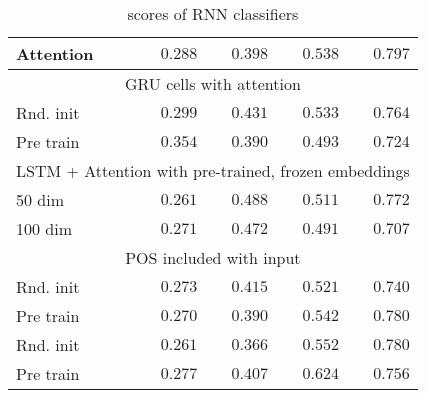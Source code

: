 \begin{table}
\begin{tabular}{lrrrr}
    Attention &         $0.288$  &         $0.398$  &         $0.538$  &         $0.797$  \\
    \midrule
              \multicolumn{5}{c}{GRU cells with attention} \\
    \midrule
    Rnd. init &         $0.299$  &         $0.431$  &         $0.533$  &         $0.764$  \\
    Pre train & $\mathbf{0.354}$ &         $0.390$  &         $0.493$  &         $0.724$  \\
    \midrule
              \multicolumn{5}{c}{LSTM + Attention with pre-trained, frozen embeddings} \\
    \midrule
    50 dim    &         $0.261$  & $\mathbf{0.488}$ &         $0.511$  &         $0.772$  \\
    100 dim   &         $0.271$  &         $0.472$  &         $0.491$  &         $0.707$  \\
    \midrule
              \multicolumn{5}{c}{POS included with input} \\
    \midrule
    Rnd. init &         $0.273$  &         $0.415$  &         $0.521$  &         $0.740$  \\
    Pre train &         $0.270$  &         $0.390$  &         $0.542$  &         $0.780$  \\
    Rnd. init &         $0.261$  &         $0.366$  &         $0.552$  &         $0.780$  \\
    Pre train &         $0.277$  &         $0.407$  & $\mathbf{0.624}$ &         $0.756$  \\
    \bottomrule
  \end{tabular}
  \caption{\FI scores of RNN classifiers}
  \label{tab:rnn-results}
\end{table}

